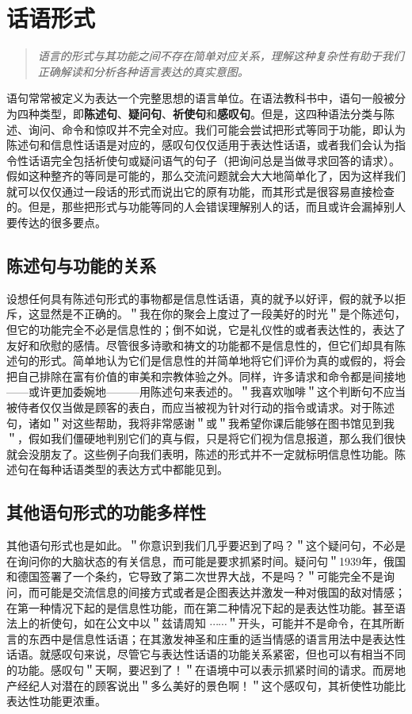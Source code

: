 \section{话语形式}

\begin{quotation}
\textit{语言的形式与其功能之间不存在简单对应关系，理解这种复杂性有助于我们正确解读和分析各种语言表达的真实意图。}
\end{quotation}

语句常常被定义为表达一个完整思想的语言单位。在语法教科书中，语句一般被分为四种类型，即\textbf{陈述句}、\textbf{疑问句}、\textbf{祈使句}和\textbf{感叹句}。但是，这四种语法分类与陈述、询问、命令和惊叹并不完全对应。我们可能会尝试把形式等同于功能，即认为陈述句和信息性话语是对应的，感叹句仅仅适用于表达性话语，或者我们会认为指令性话语完全包括祈使句或疑问语气的句子（把询问总是当做寻求回答的请求）。假如这种整齐的等同是可能的，那么交流问题就会大大地简单化了，因为这样我们就可以仅仅通过一段话的形式而说出它的原有功能，而其形式是很容易直接检查的。但是，那些把形式与功能等同的人会错误理解别人的话，而且或许会漏掉别人要传达的很多要点。

\subsection{陈述句与功能的关系}

设想任何具有陈述句形式的事物都是信息性话语，真的就予以好评，假的就予以拒斥，这显然是不正确的。＂我在你的聚会上度过了一段美好的时光＂是个陈述句，但它的功能完全不必是信息性的；倒不如说，它是礼仪性的或者表达性的，表达了友好和欣慰的感情。尽管很多诗歌和祷文的功能都不是信息性的，但它们却具有陈述句的形式。简单地认为它们是信息性的并简单地将它们评价为真的或假的，将会把自己排除在富有价值的审美和宗教体验之外。同样，许多请求和命令都是间接地——或许更加委婉地———用陈述句来表述的。＂我喜欢咖啡＂这个判断句不应当被侍者仅仅当做是顾客的表白，而应当被视为针对行动的指令或请求。对于陈述句，诸如＂对这些帮助，我将非常感谢＂或＂我希望你课后能够在图书馆见到我＂，假如我们僵硬地判别它们的真与假，只是将它们视为信息报道，那么我们很快就会没朋友了。这些例子向我们表明，陈述的形式并不一定就标明信息性功能。陈述句在每种话语类型的表达方式中都能见到。

\subsection{其他语句形式的功能多样性}

其他语句形式也是如此。＂你意识到我们几乎要迟到了吗？＂这个疑问句，不必是在询问你的大脑状态的有关信息，而可能是要求抓紧时间。疑问句＂1939年，俄国和德国签署了一个条约，它导致了第二次世界大战，不是吗？＂可能完全不是询问，而可能是交流信息的间接方式或者是企图表达并激发一种对俄国的敌对情感；在第一种情况下起的是信息性功能，而在第二种情况下起的是表达性功能。甚至语法上的祈使句，如在公文中以＂兹请周知 $\cdots \cdots$＂开头，可能并不是命令，在其所断言的东西中是信息性话语；在其激发神圣和庄重的适当情感的语言用法中是表达性话语。就感叹句来说，尽管它与表达性话语的功能关系紧密，但也可以有相当不同的功能。感叹句＂天啊，要迟到了！＂在语境中可以表示抓紧时间的请求。而房地产经纪人对潜在的顾客说出＂多么美好的景色啊！＂这个感叹句，其祈使性功能比表达性功能更浓重。

